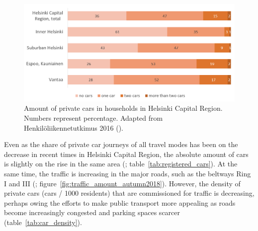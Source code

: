 \begin{figure}[H]%
    \includegraphics[width=\textwidth]{images/hlt_cars_per_household.png}
    \caption[Amount of private cars in households in Helsinki Capital Region]{Amount of private cars in households in Helsinki Capital Region. Numbers represent percentage. Adapted from Henkilöliikennetutkimus 2016 (\cite{Liikennevirasto2018}).}%
    \label{fig:cars_per_household}%
\end{figure}

Even as the share of private car journeys of all travel modes has been on the decrease in recent times in Helsinki Capital Region, the absolute amount of cars is slightly on the rise in the same area (\cite{Brandt2019}; table~\ref{tab:registered_cars}). At the same time, the traffic is increasing in the major roads, such as the beltways Ring I and III (\cite{Helsinginseudunliikenne2020}; figure~\ref{fig:traffic_amount_autumn2018}). However, the density of private cars (cars / 1000 residents) that are commissioned for traffic is decreasing, perhaps owing the efforts to make public transport more appealing as roads become increasingly congested and parking spaces scarcer (table~\ref{tab:car_density}).

